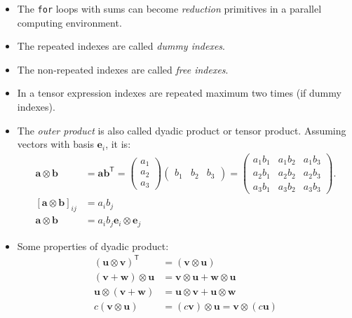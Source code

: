 \documentclass{digitaldynamics}
\def\vect#1{\bm{#1}}
\begin{document}
\begin{itemize}
	\item The \texttt{for} loops with sums can become \textit{reduction} primitives in a parallel computing environment.
	
	\item The repeated indexes are called \textit{dummy indexes}. 
	
	\item The non-repeated indexes are called \textit{free indexes}.
	
	\item In a tensor expression indexes are repeated maximum two times (if dummy indexes).  

	\item The \textit{outer product} is also called dyadic product or tensor product. Assuming vectors with basis $\vect{e}_i$, it is:
	\begin{align}
		\vect{a}\otimes\vect{b} &= \vect{a b}^\mathsf{T} = 
		\begin{pmatrix}
			a_1 \\ a_2 \\ a_3
		\end{pmatrix}\begin{pmatrix}
			b_1 & b_2 & b_3
		\end{pmatrix} = \begin{pmatrix}
			a_1 b_1 & a_1 b_2 & a_1 b_3 \\
			a_2 b_1 & a_2 b_2 & a_2 b_3 \\
			a_3 b_1 & a_3 b_2 & a_3 b_3
		\end{pmatrix}. \\
		[\vect{a} \otimes \vect{b}]_{i j} &= a_i b_j
		\\
		\vect{a} \otimes \vect{b} &= a_i b_j \vect{e}_i \otimes \vect{e}_j
	\end{align}
	
	\item Some properties of dyadic product:
	\begin{align}
    (\mathbf{u} \otimes \mathbf{v})^\mathsf{T} &= (\mathbf{v} \otimes \mathbf{u}) \\
  (\mathbf{v} + \mathbf{w}) \otimes \mathbf{u} &= \mathbf{v} \otimes \mathbf{u} + \mathbf{w} \otimes \mathbf{u} \\
  \mathbf{u} \otimes (\mathbf{v} + \mathbf{w}) &= \mathbf{u} \otimes \mathbf{v} + \mathbf{u} \otimes \mathbf{w} \\
             c (\mathbf{v} \otimes \mathbf{u}) &= (c\mathbf{v}) \otimes \mathbf{u} = \mathbf{v} \otimes (c\mathbf{u})
\end{align}

	
\end{itemize}
\end{document}
